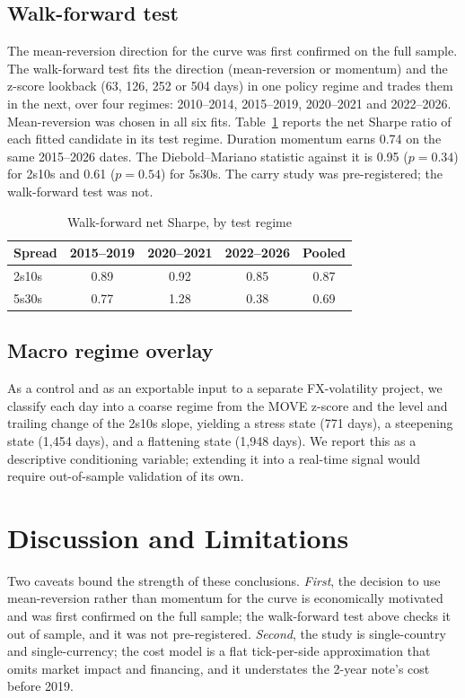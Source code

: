 \documentclass[conference]{IEEEtran}
\begin{document}
\subsection{Walk-forward test}
The mean-reversion direction for the curve was first confirmed on the full
sample. The walk-forward test fits the direction (mean-reversion or momentum)
and the z-score lookback (63, 126, 252 or 504 days) in one policy regime and
trades them in the next, over four regimes: 2010--2014, 2015--2019, 2020--2021
and 2022--2026. Mean-reversion was chosen in all six fits. Table~\ref{tab:wf}
reports the net Sharpe ratio of each fitted candidate in its test regime.
Duration momentum earns 0.74 on the same 2015--2026 dates. The
Diebold--Mariano statistic against it is 0.95 ($p=0.34$) for 2s10s and 0.61
($p=0.54$) for 5s30s. The carry study was pre-registered; the walk-forward test
was not.

\begin{table}[t]
\caption{Walk-forward net Sharpe, by test regime}
\label{tab:wf}
\centering
\begin{tabular}{lcccc}
\toprule
Spread & 2015--2019 & 2020--2021 & 2022--2026 & Pooled \\
\midrule
2s10s & 0.89 & 0.92 & 0.85 & 0.87 \\
5s30s & 0.77 & 1.28 & 0.38 & 0.69 \\
\bottomrule
\end{tabular}
\end{table}

\subsection{Macro regime overlay}
As a control and as an exportable input to a separate FX-volatility project, we
classify each day into a coarse regime from the MOVE z-score and the level and
trailing change of the 2s10s slope, yielding a stress state (771 days), a
steepening state (1{,}454 days), and a flattening state (1{,}948 days). We
report this as a descriptive conditioning variable; extending it into a
real-time signal would require out-of-sample validation of its own.

\section{Discussion and Limitations}
Two caveats bound the strength of these conclusions. \emph{First}, the decision
to use mean-reversion rather than momentum for the curve is economically
motivated and was first confirmed on the full sample; the walk-forward test
above checks it out of sample, and it was not pre-registered. \emph{Second},
the study is single-country and single-currency; the cost model is a flat
tick-per-side approximation that omits market impact and financing, and it
understates the 2-year note's cost before 2019.
\end{document}
